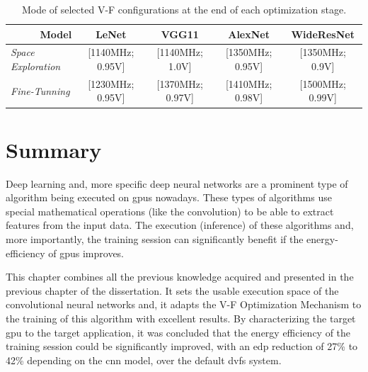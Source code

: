 \begin{table}[htb]
    \centering
    \label{tab:bestVF}
    \begin{tabular}{lcccc}
        \multicolumn{1}{r}{{\textbf{Model}}} &  \textbf{LeNet} & \textbf{VGG11} &\textbf{AlexNet} & \textbf{WideResNet} \\ \hline
        \textit{Space Exploration} &  [1140MHz; 0.95V] & [1140MHz; 1.0V] & [1350MHz; 0.95V]  & [1350MHz; 0.9V]\\
        \textit{Fine-Tunning} &  [1230MHz; 0.95V] & [1370MHz; 0.97V] & [1410MHz; 0.98V]  &[1500MHz; 0.99V]\\ \hline
    \end{tabular}%
     \caption{Mode of selected V-F configurations at the end of each optimization stage.}
\end{table}



\section{Summary}

Deep learning and, more specific deep neural networks are a prominent type of algorithm being executed on \acrshort{gpu}s nowadays. These types of algorithms use special mathematical operations (like the convolution) to be able to extract features from the input data. The execution (inference) of these algorithms and, more importantly, the training session can significantly benefit if the energy-efficiency of \acrshort{gpu}s improves.

This chapter combines all the previous knowledge acquired and presented in the previous chapter of the dissertation. It sets the usable execution space of the convolutional neural networks and, it adapts the V-F Optimization Mechanism to the training of this algorithm with excellent results. By characterizing the target \acrshort{gpu} to the target application, it was concluded that the energy efficiency of the training session could be significantly improved, with an \acrshort{edp} reduction of 27\% to 42\% depending on the \acrshort{cnn} model, over the default \acrshort{dvfs} system.
